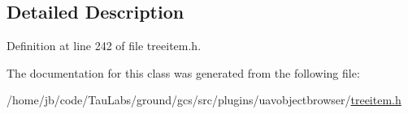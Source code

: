 \subsection{\-Detailed \-Description}


\-Definition at line 242 of file treeitem.\-h.



\-The documentation for this class was generated from the following file\-:\begin{DoxyCompactItemize}
\item 
/home/jb/code/\-Tau\-Labs/ground/gcs/src/plugins/uavobjectbrowser/\hyperlink{treeitem_8h}{treeitem.\-h}\end{DoxyCompactItemize}
